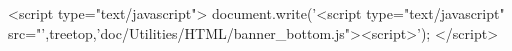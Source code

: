%
%
%
%
%

%
%
% 
%
%

\begin{rawhtml}
<script type="text/javascript">
document.write('<script type="text/javascript" src="',treetop,'doc/Utilities/HTML/banner_bottom.js"><\/script>');
</script>
\end{rawhtml}
